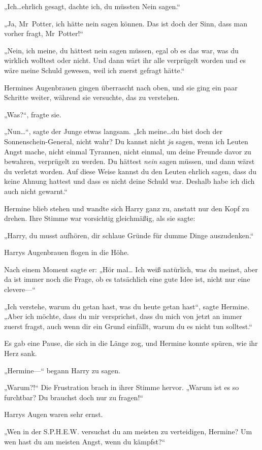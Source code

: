 {„Ich…ehrlich gesagt, dachte ich, du müssten Nein sagen.“

„Ja, Mr~Potter, ich hätte nein sagen können. Das ist doch der Sinn, dass man vorher fragt, Mr~Potter!“

„Nein, ich meine, du hättest nein sagen müssen, egal ob es das war, was du wirklich wolltest oder nicht. Und dann wärt ihr alle verprügelt worden und es wäre meine Schuld gewesen, weil ich zuerst gefragt hätte.“

Hermines Augenbrauen gingen überrascht nach oben, und sie ging ein paar Schritte weiter, während sie versuchte, das zu verstehen.

„Was?“, fragte sie.

„Nun…“, sagte der Junge etwas langsam. „Ich meine…du bist doch der Sonnenschein-General, nicht wahr? Du kannst nicht \emph{ja} sagen, wenn ich Leuten Angst mache, nicht einmal Tyrannen, nicht einmal, um deine Freunde davor zu bewahren, verprügelt zu werden. Du hättest \emph{nein} sagen müssen, und dann wärst du verletzt worden. Auf diese Weise kannst du den Leuten ehrlich sagen, dass du keine Ahnung hattest und dass es nicht deine Schuld war. Deshalb habe ich dich auch nicht gewarnt.“

Hermine blieb stehen und wandte sich Harry ganz zu, anstatt nur den Kopf zu drehen. Ihre Stimme war vorsichtig gleichmäßig, als sie sagte:

„Harry, du musst aufhören, dir schlaue Gründe für dumme Dinge auszudenken.“

Harrys Augenbrauen flogen in die Höhe.

Nach einem Moment sagte er: „Hör mal… Ich weiß natürlich, was du meinst, aber da ist immer noch die Frage, ob es tatsächlich eine gute Idee ist, nicht nur eine clevere—“

„Ich verstehe, warum du getan hast, was du heute getan hast“, sagte Hermine. „Aber ich möchte, dass du mir versprichst, dass du mich von jetzt an immer zuerst fragst, auch wenn dir ein Grund einfällt, warum du es nicht tun solltest.“

Es gab eine Pause, die sich in die Länge zog, und Hermine konnte spüren, wie ihr Herz sank.

„Hermine—“ begann Harry zu sagen.

„Warum?!“ Die Frustration brach in ihrer Stimme hervor. „Warum ist es so furchtbar? Du brauchst doch nur zu fragen!“

Harrys Augen waren sehr ernst.

„Wen in der S.P.H.E.W. versuchst du am meisten zu verteidigen, Hermine? Um wen hast du am meisten Angst, wenn du kämpfst?“

}

